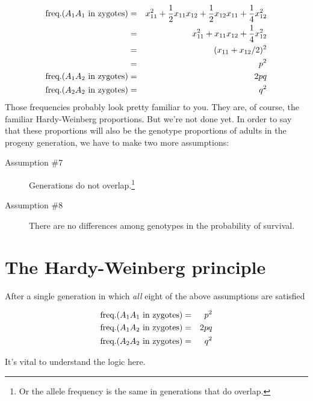 \documentclass[12pt]{article}
\begin{document}
\begin{eqnarray*}
\hbox{freq.}(A_1A_1\hbox{ in zygotes}) &=&
   x_{11}^2 + \frac{1}{2}x_{11}x_{12} + \frac{1}{2}x_{12}x_{11}
   + \frac{1}{4}x_{12}^2 \\
&=& x_{11}^2 + x_{11}x_{12} + \frac{1}{4}x_{12}^2 \\
&=& (x_{11} + x_{12}/2)^2 \\
&=& p^2 \\
\hbox{freq.}(A_1A_2\hbox{ in zygotes}) &=& 2pq \\
\hbox{freq.}(A_2A_2\hbox{ in zygotes}) &=& q^2 \\
\end{eqnarray*}
Those frequencies probably look pretty familiar to you. They are, of
course, the familiar Hardy-Weinberg proportions. But we're not done
yet. In order to say that these proportions will also be the genotype
proportions of adults in the progeny generation, we have to make two
more assumptions:

\begin{description}

\item[Assumption \#7] Generations do not overlap.\footnote{Or the
    allele frequency is the same in generations that do overlap.}

\item[Assumption \#8] There are no differences among genotypes in the
probability of survival.

\end{description}

\section*{The Hardy-Weinberg principle}

After a single generation in which {\it all\/} eight of the above
assumptions are satisfied

\begin{eqnarray}
\hbox{freq.}(A_1A_1\hbox{ in zygotes}) &=& p^2 \label{eq:hw-p2} \\
\hbox{freq.}(A_1A_2\hbox{ in zygotes}) &=& 2pq \label{eq:hw-2pq} \\
\hbox{freq.}(A_2A_2\hbox{ in zygotes}) &=& q^2 \label{eq:hw-q2}
\end{eqnarray}

\noindent It's vital to understand the logic here.
\end{document}
